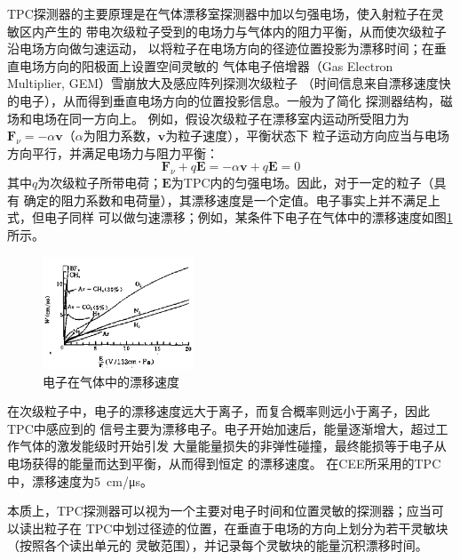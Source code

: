\documentclass[bachelor,openany,oneside,color]{buaathesis}
\begin{document}
TPC探测器的主要原理是在气体漂移室探测器中加以匀强电场，使入射粒子在灵敏区内产生的
带电次级粒子受到的电场力与气体内的阻力平衡，从而使次级粒子沿电场方向做匀速运动，
以将粒子在电场方向的径迹位置投影为漂移时间；在垂直电场方向的阳极面上设置空间灵敏的
气体电子倍增器（Gas Electron Multiplier, GEM）雪崩放大及感应阵列探测次级粒子
（时间信息来自漂移速度快的电子），从而得到垂直电场方向的位置投影信息。一般为了简化
探测器结构，磁场和电场在同一方向上。
例如，假设次级粒子在漂移室内运动所受阻力为
$\bm{F}_\nu=-\alpha\bm{v}$（$\alpha$为阻力系数，$\bm{v}$为粒子速度），平衡状态下
粒子运动方向应当与电场方向平行，并满足电场力与阻力平衡：
\begin{equation}\label{eq:det:other:eq}
	\bm{F}_\nu+q\bm{E}=-\alpha\bm{v}+q\bm{E}=0
\end{equation}
其中$q$为次级粒子所带电荷；$\bm{E}$为TPC内的匀强电场。因此，对于一定的粒子（具有
确定的阻力系数和电荷量），其漂移速度是一个定值。电子事实上并不满足上式，但电子同样
可以做匀速漂移；例如，某条件下电子在气体中的漂移速度如图\ref{fig:Drift}所示。

\begin{figure}\centering
	\includegraphics[width=0.4\textwidth]{./resource/Electron-Drift-Speed.png}
	\caption{电子在气体中的漂移速度\cite{核物理实验方法:气体}}
	\label{fig:Drift}
\end{figure}

在次级粒子中，电子的漂移速度远大于离子，而复合概率则远小于离子，因此TPC中感应到的
信号主要为漂移电子。电子开始加速后，能量逐渐增大，超过工作气体的激发能级时开始引发
大量能量损失的非弹性碰撞，最终能损等于电子从电场获得的能量而达到平衡，从而得到恒定
的漂移速度。\cite{核物理实验方法:气体}
在CEE所采用的TPC中，漂移速度为\SI{5}{\centi\meter/\micro\second}。

本质上，TPC探测器可以视为一个主要对电子时间和位置灵敏的探测器；应当可以读出粒子在
TPC中划过径迹的位置，在垂直于电场的方向上划分为若干灵敏块（按照各个读出单元的
灵敏范围），并记录每个灵敏块的能量沉积漂移时间。
\end{document}
